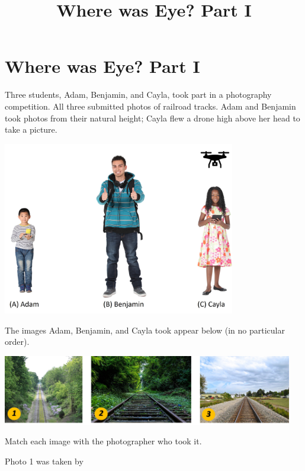 \documentclass{ximera}
\title{Where was Eye? Part I} \license{CC BY-NC-SA 4.0}
\begin{document}
\begin{abstract}
\end{abstract}
\maketitle

\section*{Where was Eye? Part I}

\begin{exploration}\label{exp:matchPic}
Three students, Adam, Benjamin, and Cayla, took part in a photography competition.  All three submitted photos of railroad tracks.  Adam and Benjamin took photos from their natural height; Cayla flew a drone high above her head to take a picture.
    \begin{image}
         \includegraphics[width=4in]{AdamBenjaminCayla.jpg}
\end{image}
The images Adam, Benjamin, and Cayla took appear below (in no particular order).
\begin{image}
         \includegraphics[width=5in]{threePics.jpg}
\end{image}
Match each image with the photographer who took it.

Photo 1 was taken by 
\begin{multipleChoice}
\end{multipleChoice}


\end{exploration}
\end{document}
